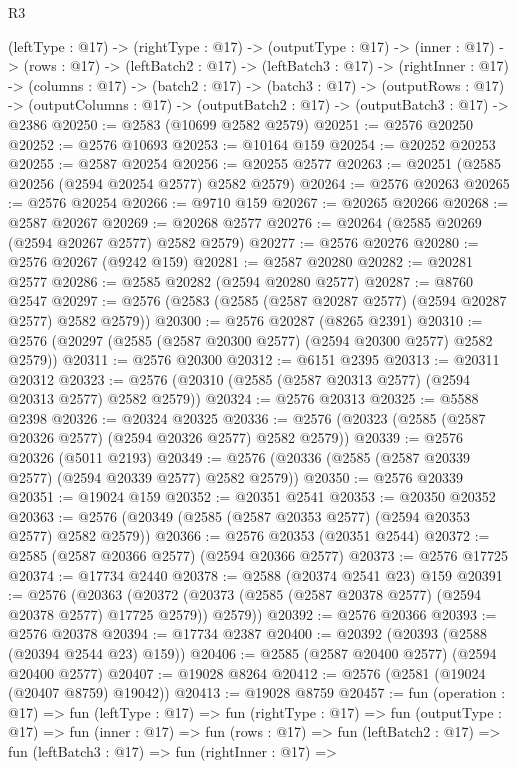 \begin{lexlean}{R3}
\begin{coremodule}
  (leftType : @17) ->
  (rightType : @17) ->
  (outputType : @17) ->
  (inner : @17) ->
  (rows : @17) ->
  (leftBatch2 : @17) ->
  (leftBatch3 : @17) ->
  (rightInner : @17) ->
  (columns : @17) ->
  (batch2 : @17) ->
  (batch3 : @17) ->
  (outputRows : @17) ->
  (outputColumns : @17) -> (outputBatch2 : @17) -> (outputBatch3 : @17) -> @2386
@20250 := @2583 (@10699 @2582 @2579)
@20251 := @2576 @20250
@20252 := @2576 @10693
@20253 := @10164 @159
@20254 := @20252 @20253
@20255 := @2587 @20254
@20256 := @20255 @2577
@20263 := @20251 (@2585 @20256 (@2594 @20254 @2577) @2582 @2579)
@20264 := @2576 @20263
@20265 := @2576 @20254
@20266 := @9710 @159
@20267 := @20265 @20266
@20268 := @2587 @20267
@20269 := @20268 @2577
@20276 := @20264 (@2585 @20269 (@2594 @20267 @2577) @2582 @2579)
@20277 := @2576 @20276
@20280 := @2576 @20267 (@9242 @159)
@20281 := @2587 @20280
@20282 := @20281 @2577
@20286 := @2585 @20282 (@2594 @20280 @2577)
@20287 := @8760 @2547
@20297 := @2576 (@2583 (@2585 (@2587 @20287 @2577) (@2594 @20287 @2577) @2582 @2579))
@20300 := @2576 @20287 (@8265 @2391)
@20310 := @2576 (@20297 (@2585 (@2587 @20300 @2577) (@2594 @20300 @2577) @2582 @2579))
@20311 := @2576 @20300
@20312 := @6151 @2395
@20313 := @20311 @20312
@20323 := @2576 (@20310 (@2585 (@2587 @20313 @2577) (@2594 @20313 @2577) @2582 @2579))
@20324 := @2576 @20313
@20325 := @5588 @2398
@20326 := @20324 @20325
@20336 := @2576 (@20323 (@2585 (@2587 @20326 @2577) (@2594 @20326 @2577) @2582 @2579))
@20339 := @2576 @20326 (@5011 @2193)
@20349 := @2576 (@20336 (@2585 (@2587 @20339 @2577) (@2594 @20339 @2577) @2582 @2579))
@20350 := @2576 @20339
@20351 := @19024 @159
@20352 := @20351 @2541
@20353 := @20350 @20352
@20363 := @2576 (@20349 (@2585 (@2587 @20353 @2577) (@2594 @20353 @2577) @2582 @2579))
@20366 := @2576 @20353 (@20351 @2544)
@20372 := @2585 (@2587 @20366 @2577) (@2594 @20366 @2577)
@20373 := @2576 @17725
@20374 := @17734 @2440
@20378 := @2588 (@20374 @2541 @23) @159
@20391 := @2576
    (@20363 (@20372 (@20373 (@2585 (@2587 @20378 @2577) (@2594 @20378 @2577) @17725 @2579)) @2579))
@20392 := @2576 @20366
@20393 := @2576 @20378
@20394 := @17734 @2387
@20400 := @20392 (@20393 (@2588 (@20394 @2544 @23) @159))
@20406 := @2585 (@2587 @20400 @2577) (@2594 @20400 @2577)
@20407 := @19028 @8264
@20412 := @2576 (@2581 (@19024 (@20407 @8759) @19042))
@20413 := @19028 @8759
@20457 := fun (operation : @17) =>
  fun (leftType : @17) =>
  fun (rightType : @17) =>
  fun (outputType : @17) =>
  fun (inner : @17) =>
  fun (rows : @17) =>
  fun (leftBatch2 : @17) =>
  fun (leftBatch3 : @17) =>
  fun (rightInner : @17) =>

\end{coremodule}
\end{lexlean}

